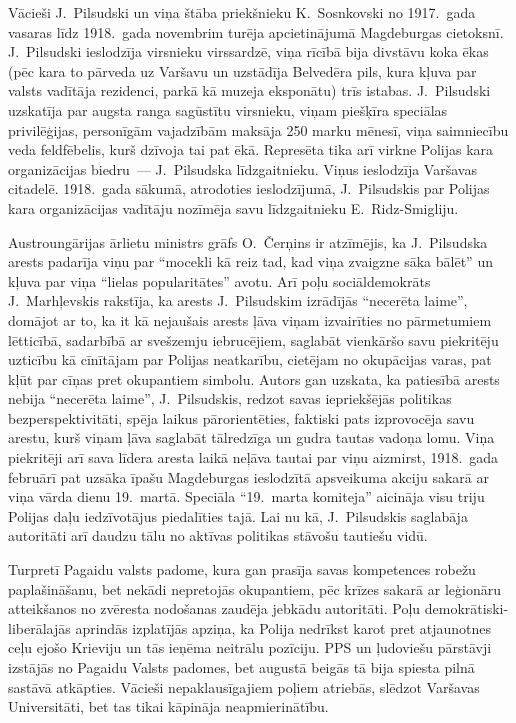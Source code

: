 \documentclass[twoside,a5paper,12pt,fleqn,openany]{extbook}
\begin{document}
Vācieši J.~Pilsudski un viņa štāba priekšnieku K.~Sosnkovski no 1917.~gada vasaras līdz 1918.~gada novembrim turēja apcietinājumā Magdeburgas cietoksnī. J.~Pilsudski ieslodzīja virsnieku virssardzē, viņa rīcībā bija divstāvu koka ēkas (pēc kara to pārveda uz Varšavu un uzstādīja Belvedēra pils, kura kļuva par valsts vadītāja rezidenci, parkā kā muzeja eksponātu) trīs istabas. J.~Pilsudski uzskatīja par augsta ranga sagūstītu virsnieku, viņam piešķīra speciālas privilēģijas, personīgām vajadzībām maksāja 250 marku mēnesī, viņa saimniecību veda feldfēbelis, kurš dzīvoja tai pat ēkā. Represēta tika arī virkne Polijas kara organizācijas biedru~--- J.~Pilsudska līdzgaitnieku. Viņus ieslodzīja Varšavas citadelē. 1918.~gada sākumā, atrodoties ieslodzījumā, J.~Pilsudskis par Polijas kara organizācijas vadītāju nozīmēja savu līdzgaitnieku E.~Ridz-Smigliju.

Austroungārijas ārlietu ministrs grāfs O.~Čerņins ir atzīmējis, ka J.~Pilsudska arests padarīja viņu par ``mocekli kā reiz tad, kad viņa zvaigzne sāka bālēt'' un kļuva par viņa ``lielas popularitātes'' avotu. Arī poļu sociāldemokrāts J.~Marhļevskis rakstīja, ka arests J.~Pilsudskim izrādījās ``necerēta laime'', domājot ar to, ka it kā nejaušais arests ļāva viņam izvairīties no pārmetumiem lētticībā, sadarbībā ar svešzemju iebrucējiem, saglabāt vienkāršo savu piekritēju uzticību kā cīnītājam par Polijas neatkarību, cietējam no okupācijas varas, pat kļūt par cīņas pret okupantiem simbolu. Autors gan uzskata, ka patiesībā arests nebija ``necerēta laime'', J.~Pilsudskis, redzot savas iepriekšējās politikas bezperspektivitāti, spēja laikus pārorientēties, faktiski pats izprovocēja savu arestu, kurš viņam ļāva saglabāt tālredzīga un gudra tautas vadoņa lomu. Viņa piekritēji arī sava līdera aresta laikā neļāva tautai par viņu aizmirst, 1918.~gada februārī pat uzsāka īpašu Magdeburgas ieslodzītā apsveikuma akciju sakarā ar viņa vārda dienu 19.~martā. Speciāla ``19.~marta komiteja'' aicināja visu triju Polijas daļu iedzīvotājus piedalīties tajā. Lai nu kā, J.~Pilsudskis saglabāja autoritāti arī daudzu tālu no aktīvas politikas stāvošu tautiešu vidū.

Turpretī Pagaidu valsts padome, kura gan prasīja savas kompetences robežu paplašināšanu, bet nekādi nepretojās okupantiem, pēc krīzes sakarā ar leģionāru atteikšanos no zvēresta nodošanas zaudēja jebkādu autoritāti. Poļu demokrātiski-liberālajās aprindās izplatījās apziņa, ka Polija nedrīkst karot pret atjaunotnes ceļu ejošo Krieviju un tās ieņēma neitrālu pozīciju. PPS un ļudoviešu pārstāvji izstājās no Pagaidu Valsts padomes, bet augustā beigās tā bija spiesta pilnā sastāvā atkāpties. Vācieši nepaklausīgajiem poļiem atriebās, slēdzot Varšavas Universitāti, bet tas tikai kāpināja neapmierinātību.
\end{document}
